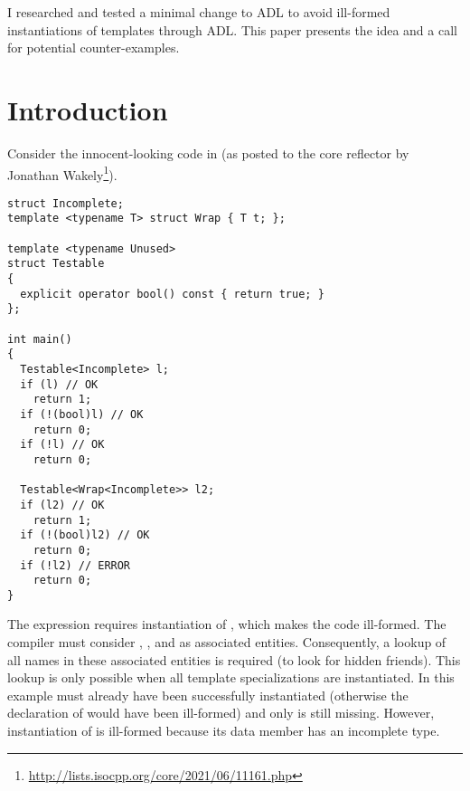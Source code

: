 \newcommand\wgTitle{A minimal ADL restriction to avoid ill-formed template instantiation}
\newcommand\wgName{Matthias Kretz <m.kretz@gsi.de>}
\newcommand\wgDocumentNumber{DMADLR0}
\newcommand\wgGroup{EWG}
\newcommand\wgTarget{\CC{}26}

\usepackage{mymacros}
\usepackage{wg21}
\usepackage{changelog}
\usepackage{underscore}



\newcommand\wglink[1]{\href{https://wg21.link/#1}{#1}}


\begin{wgTitlepage}
  I researched and tested a minimal change to ADL to avoid ill-formed instantiations of 
  templates through ADL. This paper presents the idea and a call for potential 
  counter-examples.
\end{wgTitlepage}

\pagestyle{scrheadings}

%

%

\section{Introduction}

Consider the innocent-looking code in  (as posted to the core reflector by 
Jonathan Wakely\footnote{\url{http://lists.isocpp.org/core/2021/06/11161.php}}).
\begin{lstlisting}[style=Vc,float,label=lst:example1,caption={
Ill-formed instantiation of \type{Wrap<Incomplete>} because of ADL
}]
struct Incomplete;
template <typename T> struct Wrap { T t; };

template <typename Unused>
struct Testable
{
  explicit operator bool() const { return true; }
};

int main()
{
  Testable<Incomplete> l;
  if (l) // OK
    return 1;
  if (!(bool)l) // OK
    return 0;
  if (!l) // OK
    return 0;

  Testable<Wrap<Incomplete>> l2;
  if (l2) // OK
    return 1;
  if (!(bool)l2) // OK
    return 0;
  if (!l2) // ERROR
    return 0;
}
\end{lstlisting}

The expression  requires instantiation of , which makes 
the code ill-formed. The compiler must consider , 
, and  as associated entities. Consequently, a 
lookup of all  names in these associated entities is required (to look 
for hidden friends). This lookup is only possible when all template specializations are 
instantiated. In this example
 must already have been successfully instantiated 
(otherwise the declaration of  would have been ill-formed) and only 
 is still missing. However, instantiation of 
 is ill-formed because its data member has an incomplete type.

